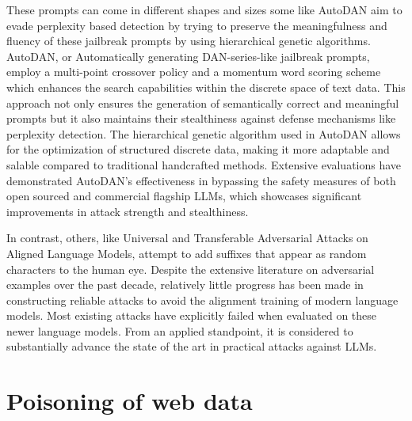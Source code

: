 \documentclass[pdflatex,sn-mathphys-num]{sn-jnl}%
\theoremstyle{thmstyleone}%
\theoremstyle{thmstyletwo}%
\theoremstyle{thmstylethree}%
\begin{document}
These prompts can come in different shapes and sizes some like AutoDAN\cite{liu2024autodan} aim to evade perplexity based detection by trying to preserve the meaningfulness and fluency of these jailbreak prompts by using hierarchical genetic algorithms. AutoDAN, or Automatically generating DAN-series-like jailbreak prompts, employ a multi-point crossover policy and a momentum word scoring scheme which enhances the search capabilities within the discrete space of text data. This approach not only ensures the generation of semantically correct and meaningful prompts but it also maintains their stealthiness against defense mechanisms like perplexity detection. The hierarchical genetic algorithm used in AutoDAN allows for the optimization of structured discrete data, making it more adaptable and salable compared to traditional handcrafted methods. Extensive evaluations have demonstrated AutoDAN's effectiveness in bypassing the safety measures of both open sourced and commercial flagship LLMs, which showcases significant improvements in attack strength and stealthiness.

In contrast, others, like Universal and Transferable Adversarial Attacks on Aligned Language Models\cite{zou2023universal}, attempt to add suffixes that appear as random characters to the human eye. Despite the extensive literature on adversarial examples over the past decade, relatively little progress has been made in constructing reliable attacks to avoid the alignment training of modern language models. Most existing attacks have explicitly failed when evaluated on these newer language models. From an applied standpoint, it is considered to substantially advance the state of the art in practical attacks against LLMs.


\section{Poisoning of web data}
\end{document}
